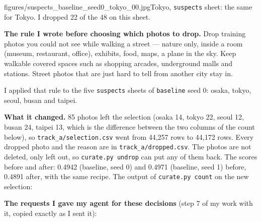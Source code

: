 \documentclass[11pt]{article}
\begin{document}
{figures/suspects_baseline_seed0_tokyo_00.jpg}{Tokyo, \texttt{suspects} sheet:
the same for Tokyo. I dropped 22 of the 48 on this sheet.}

\textbf{The rule I wrote before choosing which photos to drop.} Drop training
photos you could not see while walking a street --- nature only, inside a room
(museum, restaurant, office), exhibits, food, maps, a plane in the sky. Keep
walkable covered spaces such as shopping arcades, underground malls and
stations. Street photos that are just hard to tell from another city stay in.

I applied that rule to the five \texttt{suspects} sheets of \texttt{baseline}
seed 0: osaka, tokyo, seoul, busan and taipei.

\textbf{What it changed.} 85 photos left the selection (osaka 14, tokyo 22,
seoul 12, busan 24, taipei 13, which is the difference between the two columns
of the count below), so \texttt{track\_a/selection.csv} went from
44,257 rows to 44,172 rows. Every dropped photo and the reason are in
\texttt{track\_a/dropped.csv}. The photos are not deleted, only left out, so
\texttt{curate.py undrop} can put any of them back. The scores before and after:
0.4942 (baseline, seed 0) and 0.4971 (baseline, seed 1) before, 0.4891 after,
with the same recipe. The output of \texttt{curate.py count} on the new
selection:


\textbf{The requests I gave my agent for these decisions} (step 7 of my work
with it, copied exactly as I sent it):
\end{document}
